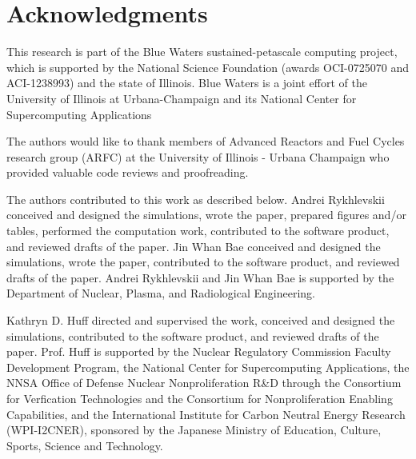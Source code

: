 \section{Acknowledgments}

This research is part of the Blue Waters sustained-petascale computing project, 
which is supported by the National Science Foundation (awards OCI-0725070 and 
ACI-1238993) and the state of Illinois. Blue Waters is a joint effort of the 
University of Illinois at Urbana-Champaign and its National Center for 
Supercomputing Applications 

The authors would like to thank  members of Advanced Reactors and Fuel Cycles
research group (ARFC) at the University of Illinois - Urbana Champaign who 
provided valuable code reviews and proofreading.

The authors contributed to this work as described below.  Andrei Rykhlevskii 
conceived and designed the simulations, wrote the paper, prepared figures 
and/or tables, performed the computation work, contributed to the software 
product, and reviewed drafts of the paper. Jin Whan Bae conceived and designed 
the simulations, wrote the paper, contributed to the software 
product, and reviewed drafts of the paper. Andrei Rykhlevskii and Jin Whan Bae 
is supported by the Department of Nuclear, Plasma, and Radiological Engineering.

Kathryn D. Huff directed and 
supervised the work, conceived and designed the simulations, 
contributed to the software product, and reviewed drafts of the paper.  Prof. 
Huff is supported by the Nuclear Regulatory Commission Faculty Development 
Program, the National Center for Supercomputing Applications, the NNSA Office 
of Defense Nuclear Nonproliferation R\&D through the Consortium for Verfication 
Technologies and the Consortium for Nonproliferation Enabling Capabilities, and 
the International Institute for Carbon Neutral Energy Research (WPI-I2CNER), 
sponsored by the Japanese Ministry of Education, Culture, Sports, Science and 
Technology.

